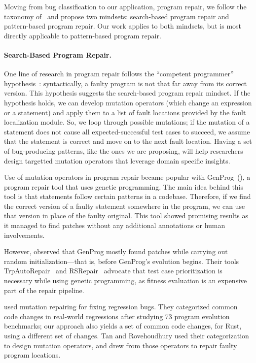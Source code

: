 Moving from bug classification to our application, program repair, we follow the taxonomy of~\cite{liu2018survey} and propose two mindsets: search-based program repair and pattern-based program repair. Our work applies to both mindsets, but is most directly applicable to pattern-based program repair.

\paragraph{Search-Based Program Repair.}
One line of research in program repair follows the ``competent programmer'' hypothesis~\citep{gopinath2014mutant}: syntactically, a faulty program is not that far away from its correct version. This hypothesis suggests the search-based program repair mindset. If the hypothesis holds, we can develop mutation operators (which change an expression or a statement) and apply them to a list of fault locations provided by the fault localization module. So, we loop through possible mutations; if the mutation of a statement does not cause all expected-successful test cases to succeed, we assume that the statement is correct and move on to the next fault location. Having a set of bug-producing patterns, like the ones we are proposing, will help researchers design targetted mutation operators that leverage domain specific insights.

Use of mutation operators in program repair became popular with GenProg~(\cite{forrest2009genetic,nguyen2009using}), a program repair tool that uses genetic programming. The main idea behind this tool is that statements follow certain patterns in a codebase. Therefore, if we find the correct version of a faulty statement somewhere in the program, we can use that version in place of the faulty original. This tool showed promising results as it managed to find patches without any additional annotations or human involvements.

However, \cite{arcuri2011practical} observed that GenProg mostly found patches while carrying out random initialization---that is, before GenProg's evolution begins. Their tools TrpAutoRepair~\citep{qi2013efficient} and RSRepair~\citep{qi2014strength} advocate that test case prioritization is necessary while using genetic programming, as fitness evaluation is an expensive part of the repair pipeline.

\cite{tan2015relifix} used mutation repairing for fixing regression bugs. They categorized common code changes in real-world regressions after studying 73 program evolution benchmarks; our approach also yields a set of common code changes, for Rust, using a different set of changes. Tan and Rovehoudhury used their categorization to design mutation operators, and drew from those operators to repair faulty program locations.


